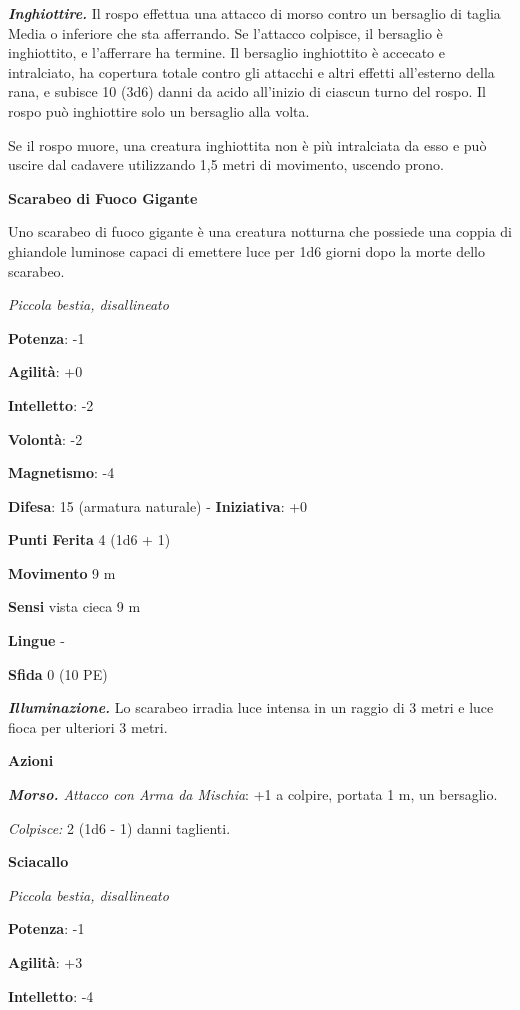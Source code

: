 \begin{multicols}{2}
\emph{\textbf{Inghiottire.}} Il rospo effettua una attacco di morso
contro un bersaglio di taglia Media o inferiore che sta afferrando. Se
l'attacco colpisce, il bersaglio è inghiottito, e l'afferrare ha
termine. Il bersaglio inghiottito è accecato e intralciato, ha copertura
totale contro gli attacchi e altri effetti all'esterno della rana, e
subisce 10 (3d6) danni da acido all'inizio di ciascun turno del rospo.
Il rospo può inghiottire solo un bersaglio alla volta.

Se il rospo muore, una creatura inghiottita non è più intralciata da
esso e può uscire dal cadavere utilizzando 1,5 metri di movimento,
uscendo prono.

\textbf{Scarabeo di Fuoco Gigante}

Uno scarabeo di fuoco gigante è una creatura notturna che possiede una
coppia di ghiandole luminose capaci di emettere luce per 1d6 giorni dopo
la morte dello scarabeo.

\emph{Piccola bestia, disallineato}

\textbf{Potenza}: -1

\textbf{Agilità}: +0

\textbf{Intelletto}: -2

\textbf{Volontà}: -2

\textbf{Magnetismo}: -4

\textbf{Difesa}: 15 (armatura naturale) - \textbf{Iniziativa}: +0

\textbf{Punti Ferita} 4 (1d6 + 1)

\textbf{Movimento} 9 m

\textbf{Sensi} vista cieca 9 m

\textbf{Lingue} -

\textbf{Sfida} 0 (10 PE)\smallskip

\emph{\textbf{Illuminazione.}} Lo scarabeo irradia luce intensa in un
raggio di 3 metri e luce fioca per ulteriori 3 metri.

\smallskip\textbf{Azioni}

\emph{\textbf{Morso.} Attacco con Arma da Mischia}: +1 a colpire,
portata 1 m, un bersaglio.

\emph{Colpisce:} 2 (1d6 - 1) danni taglienti.

\textbf{Sciacallo}

\emph{Piccola bestia, disallineato}

\textbf{Potenza}: -1

\textbf{Agilità}: +3

\textbf{Intelletto}: -4


\end{multicols}
